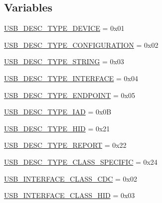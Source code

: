 \subsection*{Variables}
\begin{DoxyCompactItemize}
\item 
\hyperlink{group___p_i_o_s___u_s_b___d_e_f_s_ga5d5b7225b99998b8360b8767a2900e3f}{U\-S\-B\-\_\-\-D\-E\-S\-C\-\_\-\-T\-Y\-P\-E\-\_\-\-D\-E\-V\-I\-C\-E} = 0x01
\item 
\hyperlink{group___p_i_o_s___u_s_b___d_e_f_s_ga6eae039006b3ae9b8e3a01f07ab35514}{U\-S\-B\-\_\-\-D\-E\-S\-C\-\_\-\-T\-Y\-P\-E\-\_\-\-C\-O\-N\-F\-I\-G\-U\-R\-A\-T\-I\-O\-N} = 0x02
\item 
\hyperlink{group___p_i_o_s___u_s_b___d_e_f_s_gad0d513073ebd8880d40eb58bf2d8db8e}{U\-S\-B\-\_\-\-D\-E\-S\-C\-\_\-\-T\-Y\-P\-E\-\_\-\-S\-T\-R\-I\-N\-G} = 0x03
\item 
\hyperlink{group___p_i_o_s___u_s_b___d_e_f_s_ga264c8f6a9c7098cde24b8100333d5579}{U\-S\-B\-\_\-\-D\-E\-S\-C\-\_\-\-T\-Y\-P\-E\-\_\-\-I\-N\-T\-E\-R\-F\-A\-C\-E} = 0x04
\item 
\hyperlink{group___p_i_o_s___u_s_b___d_e_f_s_gabc893b3638b89aef5549274b6b5cdb43}{U\-S\-B\-\_\-\-D\-E\-S\-C\-\_\-\-T\-Y\-P\-E\-\_\-\-E\-N\-D\-P\-O\-I\-N\-T} = 0x05
\item 
\hyperlink{group___p_i_o_s___u_s_b___d_e_f_s_gafd77f72b6fc721482aa8b4da52d81966}{U\-S\-B\-\_\-\-D\-E\-S\-C\-\_\-\-T\-Y\-P\-E\-\_\-\-I\-A\-D} = 0x0\-B
\item 
\hyperlink{group___p_i_o_s___u_s_b___d_e_f_s_gac98c8cc86eb8aef9ea59ab530ae90778}{U\-S\-B\-\_\-\-D\-E\-S\-C\-\_\-\-T\-Y\-P\-E\-\_\-\-H\-I\-D} = 0x21
\item 
\hyperlink{group___p_i_o_s___u_s_b___d_e_f_s_gab9cf2626e6dc2b8126a7437ba89c2265}{U\-S\-B\-\_\-\-D\-E\-S\-C\-\_\-\-T\-Y\-P\-E\-\_\-\-R\-E\-P\-O\-R\-T} = 0x22
\item 
\hyperlink{group___p_i_o_s___u_s_b___d_e_f_s_ga8137d5b815f854936afe0560833d4c7b}{U\-S\-B\-\_\-\-D\-E\-S\-C\-\_\-\-T\-Y\-P\-E\-\_\-\-C\-L\-A\-S\-S\-\_\-\-S\-P\-E\-C\-I\-F\-I\-C} = 0x24
\item 
\hyperlink{group___p_i_o_s___u_s_b___d_e_f_s_ga58565a2d82321de264ab5857081bb7f3}{U\-S\-B\-\_\-\-I\-N\-T\-E\-R\-F\-A\-C\-E\-\_\-\-C\-L\-A\-S\-S\-\_\-\-C\-D\-C} = 0x02
\item 
\hyperlink{group___p_i_o_s___u_s_b___d_e_f_s_ga44130d45777cf4f11fd29079d56ef176}{U\-S\-B\-\_\-\-I\-N\-T\-E\-R\-F\-A\-C\-E\-\_\-\-C\-L\-A\-S\-S\-\_\-\-H\-I\-D} = 0x03
\item 

\end{DoxyCompactItemize}
